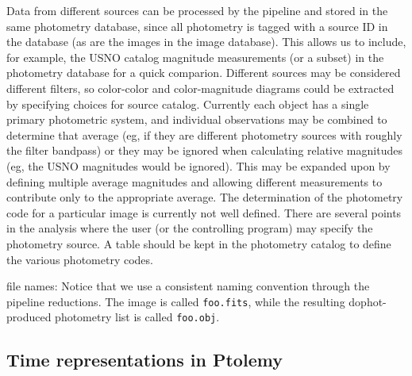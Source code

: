 \documentclass{article}
\begin{document}
Data from different sources can be processed by the pipeline and
stored in the same photometry database, since all photometry is tagged
with a source ID in the database (as are the images in the image
database).  This allows us to include, for example, the USNO catalog
magnitude measurements (or a subset) in the photometry database for a
quick comparion.  Different sources may be considered different
filters, so color-color and color-magnitude diagrams could be
extracted by specifying choices for source catalog.  Currently each
object has a single primary photometric system, and individual
observations may be combined to determine that average (eg, if they
are different photometry sources with roughly the filter bandpass) or
they may be ignored when calculating relative magnitudes (eg, the USNO
magnitudes would be ignored).  This may be expanded upon by defining
multiple average magnitudes and allowing different measurements to
contribute only to the appropriate average.  The determination of the
photometry code for a particular image is currently not well defined.
There are several points in the analysis where the user (or the
controlling program) may specify the photometry source.  A table
should be kept in the photometry catalog to define the various
photometry codes.  

file names: Notice that we use a consistent naming convention through
the pipeline reductions.  The image is called {\tt foo.fits}, while
the resulting dophot-produced photometry list is called {\tt foo.obj}.

\subsection{Time representations in Ptolemy}
\end{document}
